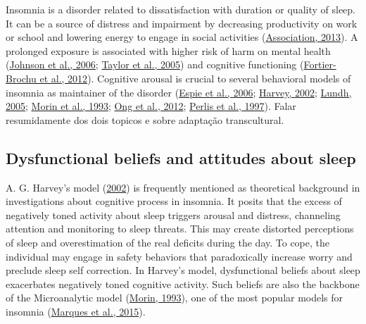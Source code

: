 \documentclass[
  ,doc,11pt, twoside,floatsintext]{apa6}
\begin{document}
Insomnia is a disorder related to dissatisfaction with duration or quality of sleep. It can be a source of distress and impairment by decreasing productivity on work or school and lowering energy to engage in social activities (\protect\hyperlink{ref-americanpsychiatricassociation2013}{Association, 2013}). A prolonged exposure is associated with higher risk of harm on mental health (\protect\hyperlink{ref-johnson2006}{Johnson et al., 2006}; \protect\hyperlink{ref-taylor2005}{Taylor et al., 2005}) and cognitive functioning (\protect\hyperlink{ref-fortier-brochu2012}{Fortier-Brochu et al., 2012}). Cognitive arousal is crucial to several behavioral models of insomnia as maintainer of the disorder (\protect\hyperlink{ref-espie2006}{Espie et al., 2006}; \protect\hyperlink{ref-harvey2002}{Harvey, 2002}; \protect\hyperlink{ref-lundh2005}{Lundh, 2005}; \protect\hyperlink{ref-morin1993}{Morin et al., 1993}; \protect\hyperlink{ref-ong2012}{Ong et al., 2012}; \protect\hyperlink{ref-perlis1997}{Perlis et al., 1997}). Falar resumidamente dos dois topicos e sobre adaptação transcultural.

\hypertarget{dysfunctional-beliefs-and-attitudes-about-sleep}{%
\subsection{Dysfunctional beliefs and attitudes about sleep}\label{dysfunctional-beliefs-and-attitudes-about-sleep}}

A. G. Harvey's model (\protect\hyperlink{ref-harvey2002}{2002}) is frequently mentioned as theoretical background in investigations about cognitive process in insomnia. It posits that the excess of negatively toned activity about sleep triggers arousal and distress, channeling attention and monitoring to sleep threats. This may create distorted perceptions of sleep and overestimation of the real deficits during the day. To cope, the individual may engage in safety behaviors that paradoxically increase worry and preclude sleep self correction. In Harvey's model, dysfunctional beliefs about sleep exacerbates negatively toned cognitive activity. Such beliefs are also the backbone of the Microanalytic model (\protect\hyperlink{ref-morin1993insomnia}{Morin, 1993}), one of the most popular models for insomnia (\protect\hyperlink{ref-marques2015}{Marques et al., 2015}).
\end{document}
